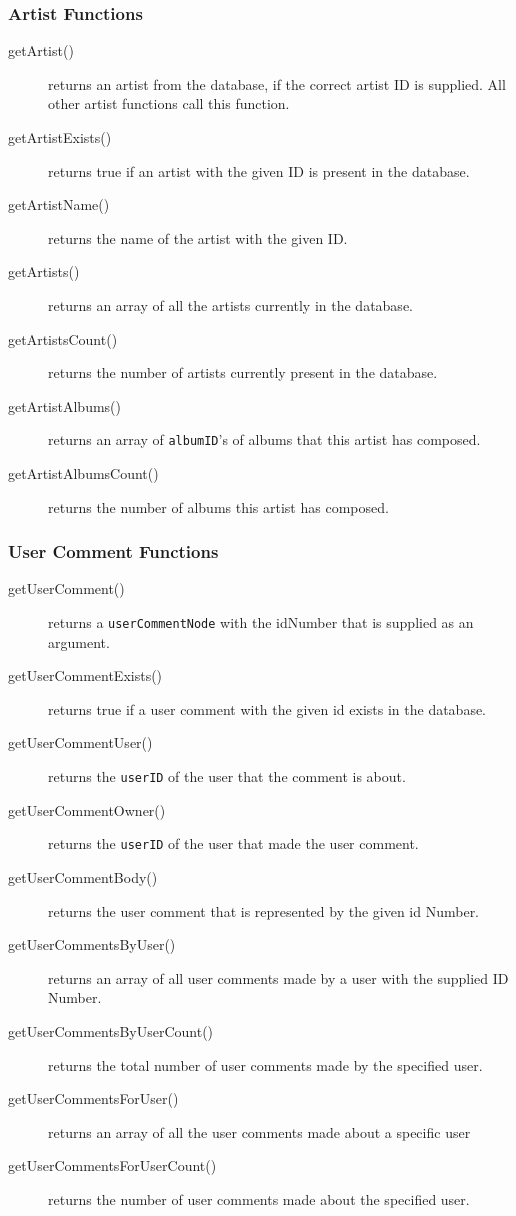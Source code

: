 \documentclass{article}
\begin{document}
\subsubsection{Artist Functions}
\begin{description}
\item[getArtist()] returns an artist from the database, if the correct artist ID is supplied. All other artist functions call this function.
\item[getArtistExists()] returns true if an artist with the given ID is present in the database.
\item[getArtistName()] returns the name of the artist with the given ID.
\item[getArtists()] returns an array of all the artists currently in the database.
\item[getArtistsCount()] returns the number of artists currently present in the database.
\item[getArtistAlbums()] returns an array of \verb|albumID|'s of albums that this artist has composed.
\item[getArtistAlbumsCount()] returns the number of albums this artist has composed.
\end{description}

\subsubsection{User Comment Functions}
\begin{description}
\item[getUserComment()] returns a \verb|userCommentNode| with the idNumber that is supplied as an argument. 
\item[getUserCommentExists()] returns true if a user comment with the given id exists in the database.
\item[getUserCommentUser()] returns the \verb|userID| of the user that the comment is about.
\item[getUserCommentOwner()] returns the \verb|userID| of the user that made the user comment.
\item[getUserCommentBody()] returns the  user comment that is represented by the given id Number.
\item[getUserCommentsByUser()] returns an array of all user comments made by a user with the supplied ID Number.
\item[getUserCommentsByUserCount()] returns the total number of user comments made by the specified user.
\item[getUserCommentsForUser()] returns an array of all the user comments made about a specific user
\item[getUserCommentsForUserCount()] returns the number of user comments made about the specified user.
\end{description}
\end{document}
